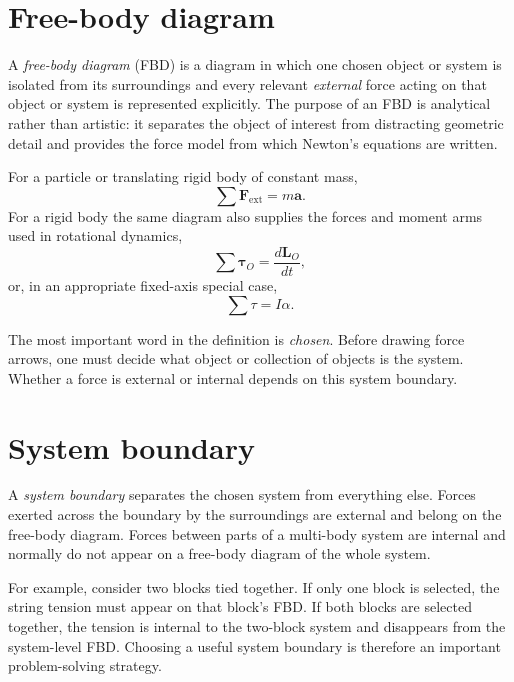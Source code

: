 
\section*{Free-body diagram}

A \emph{free-body diagram} (FBD) is a diagram in which one chosen object or system is isolated
from its surroundings and every relevant \emph{external} force acting on that object or system is
represented explicitly.  The purpose of an FBD is analytical rather than artistic: it separates
the object of interest from distracting geometric detail and provides the force model from which
Newton's equations are written.

For a particle or translating rigid body of constant mass,
\[
\sum \mathbf F_{\mathrm{ext}}=m\mathbf a.
\]
For a rigid body the same diagram also supplies the forces and moment arms used in rotational
dynamics,
\[
\sum \boldsymbol\tau_O=\frac{d\mathbf L_O}{dt},
\]
or, in an appropriate fixed-axis special case,
\[
\sum\tau=I\alpha.
\]

The most important word in the definition is \emph{chosen}.  Before drawing force arrows, one must
decide what object or collection of objects is the system.  Whether a force is external or internal
depends on this system boundary.

\section{System boundary}

A \emph{system boundary} separates the chosen system from everything else.  Forces exerted across
the boundary by the surroundings are external and belong on the free-body diagram.  Forces between
parts of a multi-body system are internal and normally do not appear on a free-body diagram of the
whole system.

For example, consider two blocks tied together.  If only one block is selected, the string tension
must appear on that block's FBD.  If both blocks are selected together, the tension is internal to
the two-block system and disappears from the system-level FBD.  Choosing a useful system boundary
is therefore an important problem-solving strategy.


